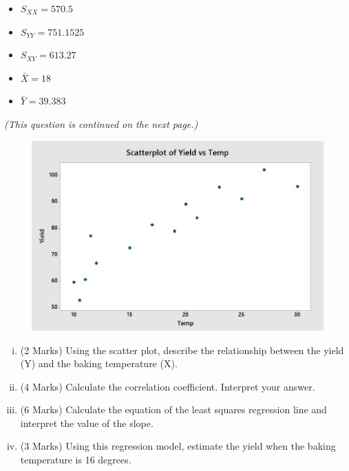 \documentclass[a4paper,12pt]{article}
\begin{document}
\begin{multicols}{3}
\begin{itemize}
	\item $S_{XX} = 570.5$
	\item $S_{YY} =  751.1525$
	\item $S_{XY} = 613.27$
	\item $\bar{X} = 18$
	\item $\bar{Y} = 39.383$
\end{itemize}
\end{multicols}
\medskip
\textit{(This question is continued on the next page.)}
\newpage

\begin{figure}
	\centering
	\includegraphics[width=0.99\linewidth]{images/MA4505RegressionPlot}
\end{figure}
\medskip
\begin{enumerate}[(i)]

	\item (2 Marks) Using the scatter plot, describe the relationship between the yield (Y) and the baking temperature (X).





		\item (4 Marks) Calculate the correlation coefficient. Interpret your answer.
		\item (6 Marks) Calculate the equation of the least squares regression line and interpret the value of the slope.
		\item (3 Marks) Using this regression model, estimate the yield when the baking temperature is 16 degrees.
\end{enumerate}
\end{document}
